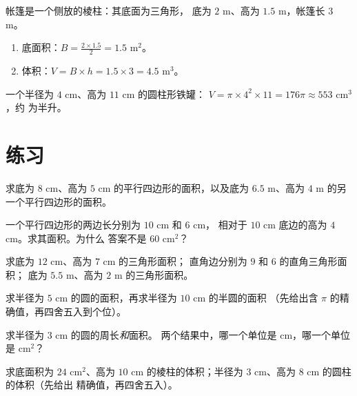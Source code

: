 \begin{example}\label{ex:g7:areas:volume}
帐篷是一个侧放的棱柱：其底面为三角形，
底为 $2$ m、高为 $1.5$ m，帐篷长 $3$ m。
\begin{enumerate}
  \item 底面积：$B = \frac{2 \times 1.5}{2} = 1.5$ m$^2$。
  \item 体积：$V = B \times h = 1.5 \times 3 = 4.5$ m$^3$。
\end{enumerate}
一个半径为 $4$ cm、高为 $11$ cm 的圆柱形铁罐：
$V = \pi \times 4^2 \times 11 = 176\pi \approx 553$ cm$^3$，约
为半升。
\end{example}

\section{练习}

\begin{exercise}[$\star$]\label{exo:g7:areas:1}
求底为 $8$ cm、高为
$5$ cm 的平行四边形的面积，以及底为 $6.5$ m、高为 $4$ m 的另一个平行四边形的面积。
\end{exercise}

\begin{exercise}[$\star$]\label{exo:g7:areas:2}
一个平行四边形的两边长分别为 $10$ cm 和 $6$ cm，
相对于 $10$ cm 底边的高为 $4$ cm。求其面积。为什么
答案不是 $60$ cm$^2$？
\end{exercise}

\begin{exercise}[$\star$]\label{exo:g7:areas:3}
求底为 $12$ cm、高为 $7$ cm 的三角形面积；
直角边分别为 $9$ 和 $6$ 的直角三角形面积；
底为 $5.5$ m、高为 $2$ m 的三角形面积。
\end{exercise}

\begin{exercise}[$\star$]\label{exo:g7:areas:4}
求半径为 $5$ cm 的圆的面积，再求半径为 $10$ cm 的半圆的面积
（先给出含 $\pi$ 的精确值，再四舍五入到个位）。
\end{exercise}

\begin{exercise}[$\star$]\label{exo:g7:areas:5}
求半径为 $3$ cm 的圆的周长\emph{和}面积。
两个结果中，哪一个单位是 cm，哪一个单位是 cm$^2$？
\end{exercise}

\begin{exercise}[$\star$]\label{exo:g7:areas:6}
求底面积为 $24$ cm$^2$、高为
$10$ cm 的棱柱的体积；半径为 $3$ cm、高为 $8$ cm 的圆柱的体积（先给出
精确值，再四舍五入）。
\end{exercise}

